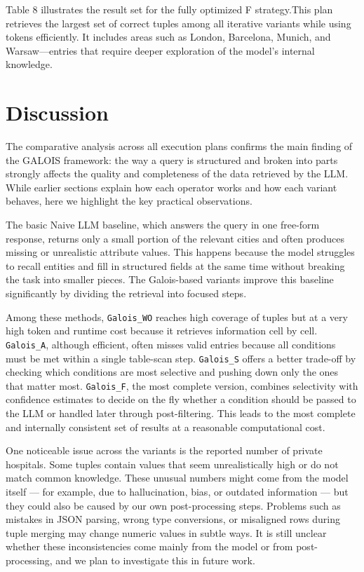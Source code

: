 \documentclass[12pt]{article}
\begin{document}
Table 8 illustrates the result set for the fully optimized F strategy.This plan retrieves the largest set of correct tuples among all iterative variants while using tokens efficiently. It includes areas such as London, Barcelona, Munich, and Warsaw—entries that require deeper exploration of the model’s internal knowledge.

\section{Discussion}
The comparative analysis across all execution plans confirms the main finding of the GALOIS framework: the way a query is structured and broken into parts strongly affects the quality and completeness of the data retrieved by the LLM. While earlier sections explain how each operator works and how each variant behaves, here we highlight the key practical observations.

The basic Naive LLM baseline, which answers the query in one free-form response, returns only a small portion of the relevant cities and often produces missing or unrealistic attribute values. This happens because the model struggles to recall entities and fill in structured fields at the same time without breaking the task into smaller pieces. The Galois-based variants improve this baseline significantly by dividing the retrieval into focused steps.

Among these methods, \texttt{Galois\_WO} reaches high coverage of tuples but at a very high token and runtime cost because it retrieves information cell by cell. \texttt{Galois\_A}, although efficient, often misses valid entries because all conditions must be met within a single table-scan step. \texttt{Galois\_S} offers a better trade-off by checking which conditions are most selective and pushing down only the ones that matter most. \texttt{Galois\_F}, the most complete version, combines selectivity with confidence estimates to decide on the fly whether a condition should be passed to the LLM or handled later through post-filtering. This leads to the most complete and internally consistent set of results at a reasonable computational cost.

One noticeable issue across the variants is the reported number of private hospitals. Some tuples contain values that seem unrealistically high or do not match common knowledge. These unusual numbers might come from the model itself — for example, due to hallucination, bias, or outdated information — but they could also be caused by our own post-processing steps. Problems such as mistakes in JSON parsing, wrong type conversions, or misaligned rows during tuple merging may change numeric values in subtle ways. It is still unclear whether these inconsistencies come mainly from the model or from post-processing, and we plan to investigate this in future work.
\end{document}
